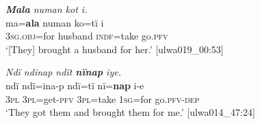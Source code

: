 \ea%
    \label{ex:complex:114}
          \textit{\textbf{Mala} numan kot i.}\\
\gll    ma=\textbf{ala}    numan    ko=tï    i\\
    3\textsc{sg.obj}=for  husband  \textsc{indf}=take  go.\textsc{pfv}\\
\glt `[They] brought a husband for her.’ [ulwa019\_00:53]
\z

\ea%
    \label{ex:complex:115}
          \textit{Ndï ndinap ndït \textbf{nïnap} iye.}\\
\gll    ndï  ndï=ina-p    ndï=tï    nï=\textbf{nap}  i-e\\
    3\textsc{pl}  3\textsc{pl}=get-\textsc{pfv}  3\textsc{pl}=take  1\textsc{sg}=for  go.\textsc{pfv-dep}\\
\glt `They got them and brought them for me.’ [ulwa014\_47:24]
\z

